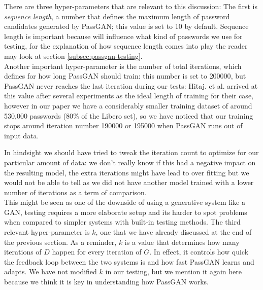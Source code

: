 There are three hyper-parameters that are relevant to this discussion: The first is \emph{sequence length}, a number that defines the maximum length of password candidates generated by PassGAN; this value is set to 10 by default. Sequence length is important because will influence what kind of passwords we use for testing, for the explanation of how sequence length comes into play the reader may look at section \ref{subsec:passgan-testing}.\\
Another important hyper-parameter is the number of total iterations, which defines for how long PassGAN should train: this number is set to $200000$, but PassGAN never reaches the last iteration during our tests: Hitaj. et al. arrived at this value after several experiments as the ideal length of training for their case, however in our paper we have a considerably smaller training dataset of around 530,000 passwords (80\% of the Libero set), so we have noticed that our training stops around iteration number 190000 or 195000 when PassGAN runs out of input data.

In hindsight we should have tried to tweak the iteration count to optimize for our particular amount of data: we don't really know if this had a negative impact on the resulting model, the extra iterations might have lead to over fitting but we would not be able to tell as we did not have another model trained with a lower number of iterations as a term of comparison.\\
This might be seen as one of the downside of using a generative system like a GAN, testing requires a more elaborate setup and its harder to spot problems when compared to simpler systems with built-in testing methods. 
The third relevant hyper-parameter is $k$, one that we have already discussed at the end of the previous section. As a reminder, $k$ is a value that determines how many iterations of $D$ happen for every iteration of $G$. In effect, it controls how quick the feedback loop between the two systems is and how fast PassGAN learns and adapts. We have not modified $k$ in our testing, but we mention it again here because we think it is key in understanding how PassGAN works. 
